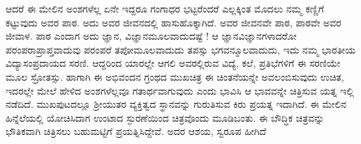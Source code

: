 {ಆದರೆ ಈ ಮೇಲಿನ ಅಂಶಗಳೆಲ್ಲ ಏನೇ ಇದ್ದರೂ ಗಂಗಾಧರ ಭಟ್ಟರೆಂದರೆ ಎಲ್ಲಕ್ಕಿಂತ ಮೊದಲು ನಮ್ಮ ಕಣ್ಣಿಗೆ ಕಟ್ಟುವುದು ಅವರ ಪಾಠ. ಅದು ಅವರ ಜೀವನದಲ್ಲಿ ಹಾಸು\enginline{-}ಹೊಕ್ಕಾಗಿದೆ. ಅವರ ಜೀವನವೇ ಪಾಠ, ಪಾಠವೇ ಅವರ \hbox{ಜೀವಾಳ.} ಪಾಠ ಎಂದಾಗ ಅದು ಜ್ಞಾನ, ವಿಜ್ಞಾನಮೂಲವಾದುದಷ್ಟೆ ! ಆ ಜ್ಞಾನ\enginline{-}ವಿಜ್ಞಾನಗಳಾದರೋ ಪರಂಪರಾ\-ಪ್ರಾಪ್ತವಾದುವು \enginline{-} ಪರಂಪರೆ ತಪೋಮೂಲವಾದುದು \enginline{-} ತಪಸ್ಸು ಭಗವನ್ಮೂಲ\-ವಾದುದು, ಇದು ನಮ್ಮ ಭಾರತೀಯ ವಿದ್ಯಾಸಂಪ್ರದಾಯದ ಸರಣಿ. ಆದ್ದರಿಂದ ಯಾರಲ್ಲೇ ಆಗಲಿ ಅವರಲ್ಲಿರುವ ವಿದ್ಯೆ, ಕಲೆ, ಪ್ರತಿಭೆಗಳಿಗೆ ಈ ಸರಣಿಯೇ ಮೂಲ ಸ್ರೋತಸ್ಸು. ಹಾಗಾಗಿ ಈ ಅಭಿವಂದನ ಗ್ರಂಥದ ಮುಖಚಿತ್ರ ಈ ಚಿಂತನೆಯನ್ನೇ ಅವಲಂಬಿಸುವುದು ಉಚಿತ, ಇದರಲ್ಲೇ ಮೇಲೆ ಹೇಳಿದ ಅಂಶಗಳೆಲ್ಲವೂ ಗತಾರ್ಥವಾಗುವುದು ಎಂದು ಭಾವಿಸಿ ಆ ಭಾವವನ್ನೇ ಚಿತ್ರಿಸುವ ಯತ್ನ ಇಲ್ಲಿ ನಡೆದಿದೆ. ಮುಖ\-ಪುಟದಲ್ಲೂ ಶ್ರೀಯುತರ ವ್ಯಕ್ತಿತ್ವದ ಸ್ಥಾನವನ್ನು ಗುರುತಿಸುವ ಕಿರು ಪ್ರಯತ್ನ ಇದಾಗಿದೆ.
ಈ ಮೇಲಿನ ಹಿನ್ನೆಲೆಯಲ್ಲಿ ಯೋಚಿಸಿದಾಗ ಉಂಟಾದ ಸ್ಫುರಣೆಯಿಂದ ಚಿತ್ರವೊಂದು ಮೂಡಿಬಂತು. ಈ ಬೌದ್ಧಿಕ ಚಿತ್ರವನ್ನು ಭೌತಿಕವಾಗಿ ಚಿತ್ರಿಸಲು ಬಹುಮಟ್ಟಿಗೆ  ಪ್ರಯತ್ನಿಸಿದ್ದೇವೆ. ಅದರ ಆಶಯ, ಸ್ವರೂಪ ಹೀಗಿದೆ \enginline{-}


}
